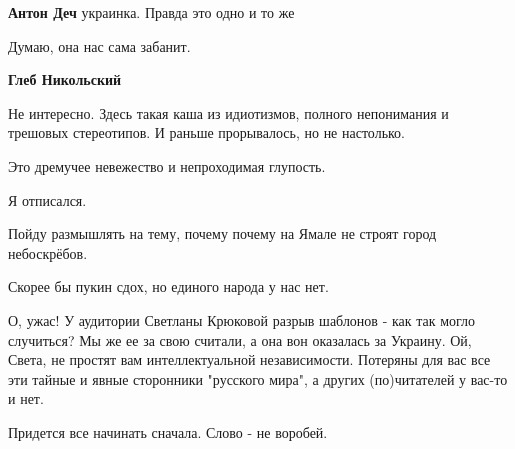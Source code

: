 \begin{itemize}
\begin{itemize}
 
\textbf{Антон Деч} украинка. Правда это одно и то же


 
Думаю, она нас сама забанит.

 
\textbf{Глеб Никольский} 

Не интересно. Здесь такая каша из идиотизмов, полного непонимания и трешовых
стереотипов. И раньше прорывалось, но не настолько.

Это дремучее невежество и непроходимая глупость.

Я отписался.

Пойду размышлять на тему, почему почему на Ямале не строят город небоскрёбов.
\end{itemize}

 
Скорее бы пукин сдох, но единого народа у нас нет.


 

О, ужас! У аудитории Светланы Крюковой разрыв шаблонов - как так могло
случиться? Мы же ее за свою считали, а она вон оказалась за Украину. Ой, Света,
не простят вам интеллектуальной независимости. Потеряны для вас все эти тайные
и явные сторонники "русского мира", а других (по)читателей у вас-то и нет.

Придется все начинать сначала. Слово - не воробей.

 


\end{itemize}
